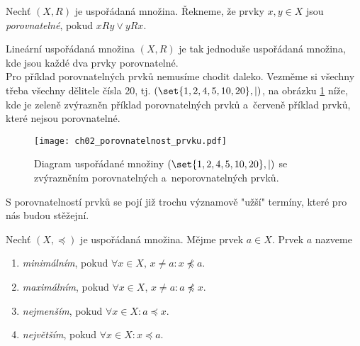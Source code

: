 \begin{definition}\label{def:porovnatelnost}
    Nechť $(X,R)$ je uspořádaná množina. Řekneme, že prvky $x,y\in X$ jsou \emph{porovnatelné}, pokud $xRy \lor yRx$.
\end{definition}
Lineární uspořádaná množina $(X,R)$ je tak jednoduše uspořádaná množina, kde jsou každé dva prvky porovnatelné.\\
Pro příklad porovnatelných prvků nemusíme chodit daleko. Vezměme si všechny třeba všechny dělitele čísla 20, tj. $(\set{1,2,4,5,10,20},\mid)$, na obrázku \ref{fig:porovnatelnost_prvku} níže, kde je zeleně zvýrazněn příklad porovnatelných prvků a~červeně příklad prvků, které nejsou porovnatelné.
\begin{figure}[H]
    \centering
    \texttt{[image: ch02\_porovnatelnost\_prvku.pdf]}
    \caption{Diagram uspořádané množiny $(\set{1,2,4,5,10,20},\mid)$ se zvýrazněním porovnatelných a~neporovnatelných prvků.}
    \label{fig:porovnatelnost_prvku}
\end{figure}
S porovnatelností prvků se pojí již trochu významově "užší" termíny, které pro nás budou stěžejní.
\begin{definition}
    Nechť $(X,\preceq)$ je uspořádaná množina. Mějme prvek $a\in X$. Prvek $a$ nazveme
    \begin{enumerate}[label=(\roman*)]
        \item \emph{minimálním}, pokud $\forall x\in X,\,x\neq a: x\not\preceq a$.
        \item \emph{maximálním}, pokud $\forall x\in X,\,x\neq a: a\not\preceq x$.
        \item \emph{nejmenším}, pokud $\forall x\in X: a\preceq x$.
        \item \emph{největším}, pokud $\forall x\in X: x\preceq a$.
    \end{enumerate}
\end{definition}
